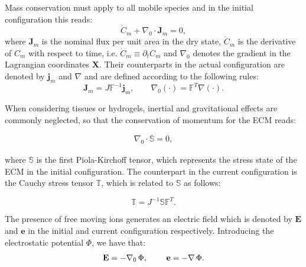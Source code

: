 \documentclass[runningheads]{llncs}
\newcommand{\F}{\ensuremath{\mathbb{F}}}
\begin{document}
Mass conservation must apply to all mobile species and in the initial configuration this reads:
\begin{equation}
\dot{C}_m + \nabla_0 \cdot \mathbf{J}_m = 0, \label{consmass}
\end{equation}
where $\mathbf{J}_m$ is the nominal flux per unit area in the dry state, $\dot{C}_m$ is the derivative of $C_m$ with respect to time, i.e.  $\dot{C}_m\equiv\partial_t C_m$ and $\nabla_0$ denotes the gradient in the Lagrangian coordinates $\mathbf{X}$. Their counterparts in the actual configuration are denoted by $\mathbf{j}_m$ and $\nabla$ and are defined according to the following rules:
\begin{equation}
\mathbf{J}_m = J \F^{-1} \mathbf{j}_m, \qquad \nabla_0 (\cdot) = \F^{T} \nabla(\cdot).
\end{equation}

When considering tissues or hydrogels, inertial and gravitational effects are commonly neglected, so that the conservation of momentum for the ECM reads:

\begin{gather}
\nabla_0 \cdot \mathbb{S}=0\label{consmom},
\end{gather}

where $\mathbb{S}$ is the first Piola-Kirchoff tensor, which represents the stress state of the ECM in the initial configuration. The counterpart in the current configuration is the Cauchy stress tensor $\mathbb{T}$, which is related to $\mathbb{S}$ as follows:

\begin{equation}
\mathbb{T} = J^{-1}\mathbb{S}\F^T.\label{TS}
\end{equation}

The presence of free moving ions generates an electric field which is denoted by $\mathbf{E}$ and $\mathbf{e}$ in the initial and current configuration respectively. Introducing the electrostatic potential $\Phi$, we have that:
\begin{equation}
\mathbf{E}= -\nabla_0 \, \Phi, \hspace{8mm} \mathbf{e}= - \nabla \, \Phi.
\label{Phi}
\end{equation}
\end{document}
